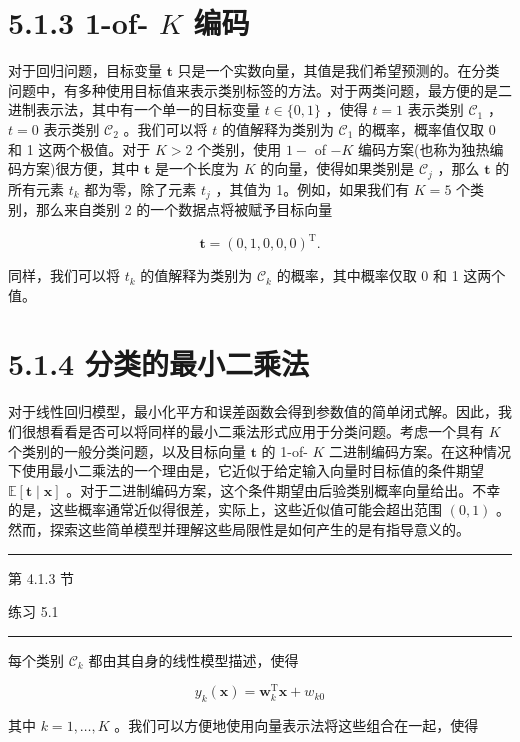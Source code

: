 \documentclass[10pt]{report}
\newcommand{\HRule}{\begin{center}\rule{0.9\linewidth}{0.2mm}\end{center}}
\begin{document}
\section*{5.1.3 1-of- \(K\) 编码}

对于回归问题，目标变量 \(\mathbf{t}\) 只是一个实数向量，其值是我们希望预测的。在分类问题中，有多种使用目标值来表示类别标签的方法。对于两类问题，最方便的是二进制表示法，其中有一个单一的目标变量 \(t \in  \{ 0,1\}\) ，使得 \(t = 1\) 表示类别 \({\mathcal{C}}_{1}\) ， \(t = 0\) 表示类别 \({\mathcal{C}}_{2}\) 。我们可以将 \(t\) 的值解释为类别为 \({\mathcal{C}}_{1}\) 的概率，概率值仅取 0 和 1 这两个极值。对于 \(K > 2\) 个类别，使用 \(1 -\) of \(- K\) 编码方案(也称为独热编码方案)很方便，其中 \(\mathbf{t}\) 是一个长度为 \(K\) 的向量，使得如果类别是 \({\mathcal{C}}_{j}\) ，那么 \(\mathbf{t}\) 的所有元素 \({t}_{k}\) 都为零，除了元素 \({t}_{j}\) ，其值为 1。例如，如果我们有 \(K = 5\) 个类别，那么来自类别 2 的一个数据点将被赋予目标向量

\[
\mathbf{t} = {\left( 0,1,0,0,0\right) }^{\mathrm{T}}. \tag{5.11}
\]

同样，我们可以将 \({t}_{k}\) 的值解释为类别为 \({\mathcal{C}}_{k}\) 的概率，其中概率仅取 0 和 1 这两个值。

\section*{5.1.4 分类的最小二乘法}

对于线性回归模型，最小化平方和误差函数会得到参数值的简单闭式解。因此，我们很想看看是否可以将同样的最小二乘法形式应用于分类问题。考虑一个具有 \(K\) 个类别的一般分类问题，以及目标向量 \(\mathbf{t}\) 的 1-of- \(K\) 二进制编码方案。在这种情况下使用最小二乘法的一个理由是，它近似于给定输入向量时目标值的条件期望 \(\mathbb{E}\left\lbrack  {\mathbf{t} \mid  \mathbf{x}}\right\rbrack\) 。对于二进制编码方案，这个条件期望由后验类别概率向量给出。不幸的是，这些概率通常近似得很差，实际上，这些近似值可能会超出范围 \(\left( {0,1}\right)\) 。然而，探索这些简单模型并理解这些局限性是如何产生的是有指导意义的。

\HRule

第 4.1.3 节

练习 5.1

\HRule

每个类别 \({\mathcal{C}}_{k}\) 都由其自身的线性模型描述，使得

\[
{y}_{k}\left( \mathbf{x}\right)  = {\mathbf{w}}_{k}^{\mathrm{T}}\mathbf{x} + {w}_{k0} \tag{5.12}
\]

其中 \(k = 1,\ldots ,K\) 。我们可以方便地使用向量表示法将这些组合在一起，使得
\end{document}
